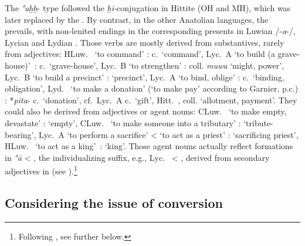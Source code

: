 \documentclass[output=paper,colorlinks,citecolor=brown]{langscibook}
\begin{document}
The \textit{°aḫḫ}- type followed the \textit{ḫi-}conjugation in Hittite (OH and MH), which was later replaced by the .  By contrast, in the other Anatolian languages, the  prevails, with non-lenited endings in the corresponding presents in Luwian /-\textit{a}-/,    Lycian  and Lydian . Those verbs are mostly derived from substantives, rarely from adjectives: HLuw.\   ‘to command’ :  c.\ ‘command’, Lyc.\  A  ‘to build (a grave-\mbox{house)’ :}  c.\ ‘grave-house’, Lyc.\  B  ‘to strengthen’ : coll. \textit{muwa} ‘might, power’, Lyc.\  B  ‘to build a precinct’ :  ‘precinct’, Lyc.\  A  ‘to bind, oblige’ :  c.\ ‘binding, obligation’, Lyd.\  ‘to make a donation’ (‘to make pay’ according to Garnier, p.c.) : *\textit{pita}- c.\ ‘donation’, cf.\  Lyc.\  A  c.\ ‘gift’, Hitt.\ , coll. ‘allotment, payment’. They could also be derived from adjectives or agent nouns: CLuw.\  ‘to make empty, devastate’ :  ‘empty’, CLuw.\  ‘to make someone into a tributary’ :  ‘tribute-bearing’, Lyc.\ A  ‘to perform a sacrifice’ < ‘to act as a priest’ :  ‘sacrificing priest’, HLuw.\   ‘to act as a \mbox{king’ :}  ‘king’. Those agent nouns actually reflect formations in \textit{°ā} < , the individualizing suffix, e.g., Lyc.\   < , derived from secondary adjectives in  (see \citealt{Sasseville2014,Sasseville2018}).\footnote{Following \citealt{Melchert2014}, see further below.} 

\subsection{Considering the issue of conversion}
\end{document}

